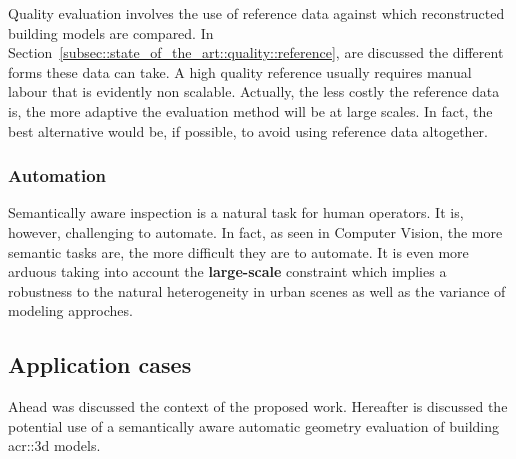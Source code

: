             Quality evaluation involves the use of reference data against which reconstructed building models are compared.
            In Section~\ref{subsec::state_of_the_art::quality::reference}, are discussed the different forms these data can take.
            A high quality reference usually requires manual labour that is evidently non scalable.
            Actually, the less costly the reference data is, the more adaptive the evaluation method will be at large scales.
            In fact, the best alternative would be, if possible, to avoid using reference data altogether.

        \subsubsection{Automation}
            Semantically aware inspection is a natural task for human operators.
            It is, however, challenging to automate.
            In fact, as seen in Computer Vision, the more semantic tasks are, the more difficult they are to automate.
            It is even more arduous taking into account the \textbf{large-scale} constraint which implies a robustness to the natural heterogeneity in urban scenes as well as the variance of modeling approches.

    \subsection{Application cases}
        \label{subsec::introduction::contributions::use}
        Ahead was discussed the context of the proposed work.
        Hereafter is discussed the potential use of a semantically aware automatic geometry evaluation of building \gls{acr::3d} models.
